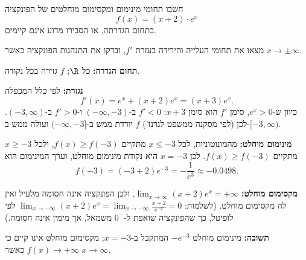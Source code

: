 
\begin{question}
חשבו תחומי מינימום ומקסימום מוחלטים של הפונקציה
\[ f(x)=(x+2)\cdot e^x \]
בתחום הגדרתה, או הסבירו מדוע אינם קיימים.
\end{question}

\begin{hint}
מצאו את תחומי העלייה והירידה בעזרת $f'$, ובדקו את התנהגות הפונקציה כאשר $x\to\pm\infty$.
\end{hint}

\begin{solution}
\textbf{תחום הגדרה:} כל $\R$; $f$ גזירה בכל נקודה.

\textbf{נגזרת:} לפי כלל המכפלה
\[ f'(x)=e^x+(x+2)e^x=(x+3)e^x. \]
כיוון ש-$e^x>0$, סימן $f'$ הוא סימן $x+3$: $f'<0$ ב-$(-\infty,-3)$ ו-$f'>0$ ב-$(-3,\infty)$. לכן (לפי מסקנה ממשפט לגרנז') $f$ יורדת ממש ב-$(-\infty,-3]$ ועולה ממש ב-$[-3,\infty)$.

\textbf{מינימום מוחלט:} מהמונוטוניות, לכל $x\le-3$ מתקיים $f(x)\ge f(-3)$, ולכל $x\ge-3$ מתקיים $f(x)\ge f(-3)$. לכן $x=-3$ היא נקודת מינימום מוחלט, וערך המינימום הוא
\[ f(-3)=(-3+2)e^{-3}=-\frac1{e^3}\approx-0.0498. \]

\textbf{מקסימום מוחלט:} $\lim_{x\to\infty}(x+2)e^x=+\infty$, ולכן הפונקציה אינה חסומה מלעיל ואין לה מקסימום מוחלט. (לשלמות: $\lim_{x\to-\infty}(x+2)e^x=\lim_{x\to-\infty}\frac{x+2}{e^{-x}}=0$ לפי לופיטל, כך שהפונקציה שואפת ל-$0^-$ משמאל, אך מימין אינה חסומה.)

\textbf{תשובה:} מינימום מוחלט $-e^{-3}$ המתקבל ב-$x=-3$; מקסימום מוחלט אינו קיים כי $f(x)\to+\infty$ כאשר $x\to\infty$.
\end{solution}
